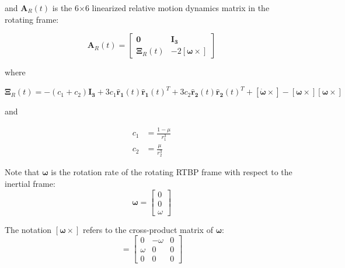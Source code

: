 \documentclass[letterpaper, preprint, paper,11pt]{AAS}	%
\begin{document}
and  \(\mathbf{A}_R(t)\) is the 6\(\times\)6 linearized relative motion dynamics matrix in the rotating frame: %

\begin{equation} \label{eq:RelmoDynMatrix}
	\mathbf{A}_R(t) = \begin{bmatrix}
		\mathbf{0}          & \mathbf{I_3} \\
		\mathbf{\Xi}_R(t) & -2 [\boldsymbol{\omega} \times]
	\end{bmatrix}
\end{equation}

where

\begin{equation}
	\mathbf{\Xi}_R(t) = -(c_1 + c_2)\mathbf{I_3} 
	+ 3c_1\mathbf{\hat{r}_1}(t) \mathbf{\hat{r}_1}(t)^T 
	+ 3c_2\mathbf{\hat{r}_2}(t) \mathbf{\hat{r}_2}(t)^T 
	+ [\boldsymbol{\dot{\omega}} \times] 
	- [\boldsymbol{\omega}\times][\boldsymbol{\omega}\times]
\end{equation}

and

\begin{equation}
	\begin{aligned}
		c_1 &= \frac{1- \mu}{r_1^3} \\
		c_2 &= \frac{\mu}{r_2^3}
	\end{aligned}
\end{equation}

Note that \(\boldsymbol{\omega}\) is the rotation rate of the rotating RTBP frame with respect to the inertial frame:
\begin{equation}
	\boldsymbol{\omega} = \begin{bmatrix}
		0 \\ 
		0 \\
		\omega
	\end{bmatrix}
\end{equation}

The notation  \([\boldsymbol{\omega}\times]\) refers to the cross-product matrix of \(\boldsymbol{\omega}\):
\begin{equation}
	[\boldsymbol{\omega}\times] = \begin{bmatrix}
		0           & -\omega & 0 \\ 
		\omega & 0             & 0 \\
		0           & 0             & 0
	\end{bmatrix}
\end{equation}
\end{document}
